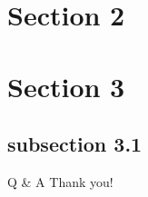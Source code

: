 \documentclass[handout]{beamer}
\begin{document}
\section{Section 2}
\section{Section 3}
\subsection{subsection 3.1}
\begin{frame}{Q \& A}
    Thank you!
\end{frame}
\end{document}
